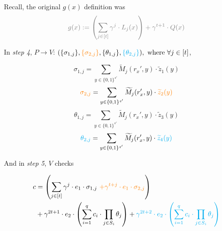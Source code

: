 \documentclass{article}
\theoremstyle{definition}
\begin{document}

Recall, the original $g(x)$ definition was
$$\textcolor{gray}{g(x) := \left( \sum_{j \in [t]} \gamma^j \cdot L_j(x) \right) + \gamma^{t+1} \cdot Q(x)}$$



\vspace{0.5cm}
In \emph{step 4}, $P \rightarrow V$:
$(\{\sigma_{1,j}\}, \textcolor{orange}{\{\sigma_{2,j}\}}, \{\theta_{1,j}\}, \textcolor{cyan}{\{\theta_{2,j}\}}),~ \text{where} ~\forall j \in [t]$,

$$\sigma_{1,j} = \sum_{y \in \{0,1\}^{s'}} \widetilde{M}_j(r_x', y) \cdot \widetilde{z}_1(y)$$
$$\textcolor{orange}{\sigma_{2,j}} = \sum_{y \in \{0,1\}^{s'}} \widetilde{M}_j(r_x', y) \cdot \textcolor{orange}{\widetilde{z}_2(y)}$$
$$\theta_{1,j} = \sum_{y \in \{0, 1\}^{s'}} \widetilde{M}_j(r_x', y) \cdot \widetilde{z}_3(y)$$
$$\textcolor{cyan}{\theta_{2,j}} = \sum_{y \in \{0, 1\}^{s'}} \widetilde{M}_j(r_x', y) \cdot \textcolor{cyan}{\widetilde{z}_4(y)}$$


\vspace{1cm}

And in \emph{step 5}, $V$ checks

\begin{align*}
	c &= \left(\sum_{j \in [t]} \gamma^j \cdot e_1 \cdot \sigma_{1,j}
~\textcolor{orange}{+ \gamma^{t+j} \cdot e_1 \cdot \sigma_{2,j}}\right)\\
	  &+ \gamma^{2t+1} \cdot e_2 \cdot \left( \sum_{i=1}^q c_i \cdot \prod_{j \in S_i} \theta_j \right)
	  + \textcolor{cyan}{\gamma^{2t+2} \cdot e_2 \cdot \left( \sum_{i=1}^q c_i \cdot \prod_{j \in S_i} \theta_j \right)} 
\end{align*}
\end{document}
